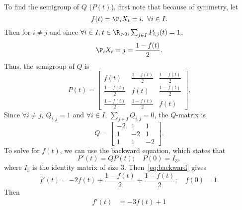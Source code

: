 \documentclass[
  coursecode={MTHE 455},
  assignmentname={Assignment \assignmentnumber},
  studentnumber=20053722,
  name={Bryan Hoang},
  draft,
]{
  ltxanswer%
}
\begin{document}
  \begin{questions}
    \setcounter{question}{\questionnumber}
    \addtocounter{question}{-1}
    \question[6]{}
    \begin{solution}
      To find the semigroup of \(Q\) (\(P(t)\)), first note that because of symmetry, let
      \begin{equation*}
        f(t) = \P_{i}{X_{t} = i}, \ \forall i \in I.
      \end{equation*}
      Then for \(i \ne j\) and since \(\forall i \in I, t \in \R_{>0}, \sum_{j \in I} P_{i,j}(t) = 1\),
      \begin{equation*}
        \P_{i}{X_{t} = j} = \frac{1 - f(t)}{2}.
      \end{equation*}
      Thus, the semigroup of \(Q\) is
      \begin{equation*}
        P(t) = \begin{bmatrix}
          f(t)             & \frac{1-f(t)}{2} & \frac{1-f(t)}{2} \\
          \frac{1-f(t)}{2} & f(t)             & \frac{1-f(t)}{2} \\
          \frac{1-f(t)}{2} & \frac{1-f(t)}{2} & f(t)
        \end{bmatrix}.
      \end{equation*}
      Since \(\forall i \ne j,\ Q_{i,j} = 1\) and \(\forall i \in I,\ \sum_{j \in I} Q_{i,j} = 0\), the \(Q\)-matrix is
      \begin{equation*}
        Q = \begin{bmatrix}
          -2 & 1  & 1  \\
          1  & -2 & 1  \\
          1  & 1  & -2
        \end{bmatrix}.
      \end{equation*}
      To solve for \(f(t)\), we can use the backward equation, which states that
      \begin{equation}\label{eq:backward}
        P'(t) = QP(t);\quad P(0) = I_{3},
      \end{equation}
      where \(I_{3}\) is the identity matrix of size \(3\). Then~\eqref{eq:backward} gives
      \begin{equation}\label{eq:backward-implication}
        f'(t) = -2f(t) + \frac{1 - f(t)}{2} + \frac{1 - f(t)}{2};\quad f(0) = 1.
      \end{equation}
      Then
      \begin{align*}
        f'(t)                                         &= -3f(t) + 1                                                      \\

\end{align*}
\end{solution}
\end{questions}
\end{document}
